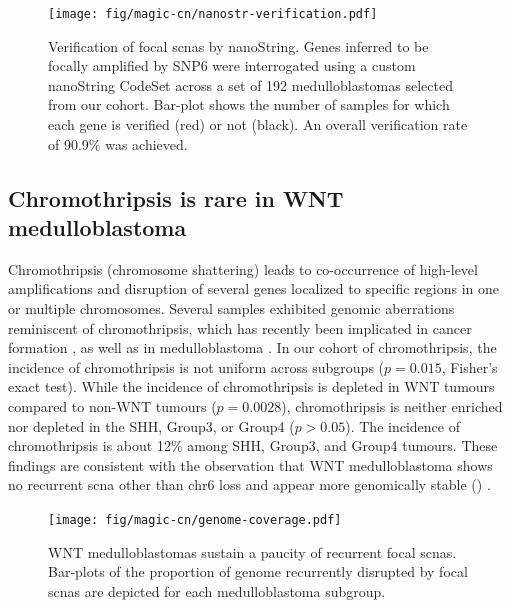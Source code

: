 \begin{figure}
	\centering
	\texttt{[image: fig/magic-cn/nanostr-verification.pdf]}
	\caption[Verification of focal \gls{scnas} by nanoString]
	{
		Verification of focal \gls{scnas} by nanoString.
		Genes inferred to be focally amplified by SNP6 were interrogated using a custom nanoString CodeSet across a set of 192 medulloblastomas selected from our cohort. Bar-plot shows the number of samples for which each gene is verified (red) or not (black). An overall verification rate of 90.9\% was achieved.
	}
	\label{fig:nanostr-verification}
\end{figure}

\subsection{Chromothripsis is rare in WNT medulloblastoma}

Chromothripsis (chromosome shattering) leads to co-occurrence of high-level amplifications and disruption of several genes localized to specific regions in one or multiple chromosomes. Several samples exhibited genomic aberrations reminiscent of chromothripsis, which has recently been implicated in cancer formation , as well as in medulloblastoma . In our cohort of chromothripsis, the incidence of chromothripsis is not uniform across subgroups ($p = 0.015$, Fisher's exact test). While the incidence of chromothripsis is depleted in WNT tumours compared to non-WNT tumours ($p = 0.0028$), chromothripsis is neither enriched nor depleted in the SHH, Group3, or Group4 ($p > 0.05$). The incidence of chromothripsis is about 12\% among SHH, Group3, and Group4 tumours. These findings are consistent with the observation that WNT medulloblastoma shows no recurrent \gls{scna} other than chr6 loss and appear more genomically stable () .

\begin{figure}
	\centering
	\texttt{[image: fig/magic-cn/genome-coverage.pdf]}
	\caption[WNT medulloblastomas sustain a paucity of recurrent focal \gls{scnas}.]
	{
		WNT medulloblastomas sustain a paucity of recurrent focal \gls{scnas}.
		Bar-plots of the proportion of genome recurrently disrupted by focal \gls{scnas} are depicted for each medulloblastoma subgroup.
	}
	\label{fig:genome-coverage}
\end{figure}

